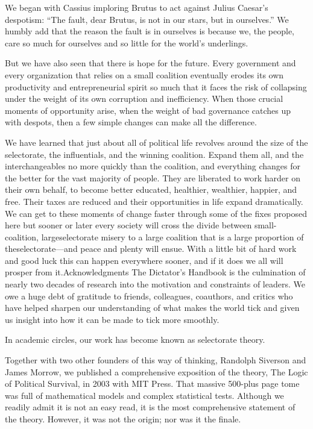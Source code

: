 \documentclass[10pt]{article}
\begin{document}
{\large We began with Cassius imploring Brutus to act against Julius Caesar's
despotism: ``The fault, dear Brutus, is not in our stars, but in ourselves.'' We
humbly add that the reason the fault is in ourselves is because we, the people,
care so much for ourselves and so little for the world's underlings.}

{\large But we have also seen that there is hope for the future. Every
government and every organization that relies on a small coalition eventually
erodes its own productivity and entrepreneurial spirit so much that it faces the
risk of collapsing under the weight of its own corruption and inefficiency. When
those crucial moments of opportunity arise, when the weight of bad governance
catches up with despots, then a few simple changes can make all the difference.}

{\large We have learned that just about all of political life revolves around
the size of the selectorate, the influentials, and the winning coalition. Expand
them all, and the interchangeables no more quickly than the coalition, and
everything changes for the better for the vast majority of people. They are
liberated to work harder on their own behalf, to become better educated,
healthier, wealthier, happier, and free. Their taxes are reduced and their
opportunities in life expand dramatically. We can get to these moments of change
faster through some of the fixes proposed here but sooner or later every society
will cross the divide between small-coalition, largeselectorate misery to a large
coalition that is a large proportion of theselectorate---and peace and plenty
will ensue. With a little bit of hard work and good luck this can happen
everywhere sooner, and if it does we all will prosper from it.Acknowledgments The
Dictator's Handbook is the culmination of nearly two decades of research into the
motivation and constraints of leaders. We owe a huge debt of gratitude to
friends, colleagues, coauthors, and critics who have helped sharpen our
understanding of what makes the world tick and given us insight into how it can
be made to tick more smoothly.}

{\large In academic circles, our work has become known as selectorate theory.}

{\large Together with two other founders of this way of thinking, Randolph
Siverson and James Morrow, we published a comprehensive exposition of the theory,
The Logic of Political Survival, in 2003 with MIT Press. That massive 500-plus
page tome was full of mathematical models and complex statistical tests. Although
we readily admit it is not an easy read, it is the most comprehensive statement
of the theory. However, it was not the origin; nor was it the finale.}
\end{document}
